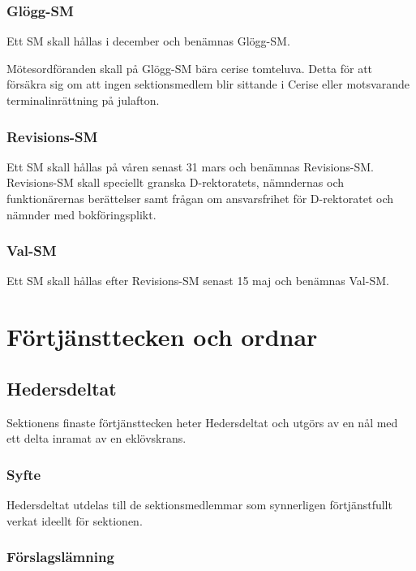 \documentclass{dgovdoc}
\begin{document}
\subsubsection{Glögg-SM}

Ett SM skall hållas i december och benämnas Glögg-SM.

Mötesordföranden skall på Glögg-SM bära cerise tomteluva. Detta för att
försäkra sig om att ingen sektionsmedlem blir sittande i Cerise eller
motsvarande terminalinrättning på julafton.

\subsubsection{Revisions-SM}

Ett SM skall hållas på våren senast 31 mars och benämnas Revisions-SM.
Revisions-SM skall speciellt granska D-rektoratets, nämndernas och
funktionärernas berättelser samt frågan om ansvarsfrihet för D-rektoratet och
nämnder med bokföringsplikt.

\subsubsection{Val-SM}

Ett SM skall hållas efter Revisions-SM senast 15 maj och benämnas Val-SM.

\section{Förtjänsttecken och ordnar}

\subsection{Hedersdeltat}

Sektionens finaste förtjänsttecken heter Hedersdeltat och utgörs av en nål med
ett delta inramat av en eklövskrans.

\subsubsection{Syfte}

Hedersdeltat utdelas till de sektionsmedlemmar som synnerligen förtjänstfullt
verkat ideellt för sektionen.

\subsubsection{Förslagslämning}
\end{document}
